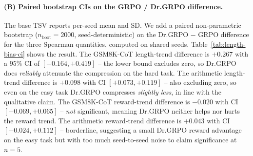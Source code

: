 \paragraph{(B) Paired bootstrap CIs on the GRPO / Dr.GRPO difference.}
The base TSV reports per-seed mean and SD. We add a paired
non-parametric bootstrap ($n_\text{boot}=2000$, seed-deterministic)
on the Dr.GRPO $-$ GRPO difference for the three Spearman
quantities, computed on shared seeds. Table~\ref{tab:length-bias-ci}
shows the result. The GSM8K-CoT length-trend difference is
$+0.267$ with a $95\%$ CI of $[+0.164, +0.419]$ -- the lower
bound excludes zero, so Dr.GRPO does \emph{reliably} attenuate
the compression on the hard task. The arithmetic length-trend
difference is $+0.098$ with CI $[+0.073, +0.119]$ -- also
excluding zero, so even on the easy task Dr.GRPO compresses
\emph{slightly less}, in line with the qualitative claim. The
GSM8K-CoT reward-trend difference is $-0.020$ with CI
$[-0.069, +0.065]$ -- \emph{not} significant, meaning Dr.GRPO
neither helps nor hurts the reward trend. The arithmetic
reward-trend difference is $+0.043$ with CI $[-0.024, +0.112]$ --
borderline, suggesting a small Dr.GRPO reward advantage on the
easy task but with too much seed-to-seed noise to claim
significance at $n{=}5$.

\begin{table}[htbp]
\centering
\small
{}
\caption{Paired bootstrap $95\%$ CIs on the Dr.GRPO $-$ GRPO
difference for the three Spearman quantities. Positive
$\Delta\rho(\text{step},\text{len})$ means Dr.GRPO compresses
\emph{less} (closer to zero or positive). On both tasks the
length-trend difference is significantly positive; the
reward-trend difference is not significantly different from zero
on either task. The within-run coupling
$\Delta\rho(\text{len},\text{reward})$ is positive on the easy
task (Dr.GRPO weakens the negative within-run coupling) and
negative on the hard task (Dr.GRPO strengthens it).}
\label{tab:length-bias-ci}
\end{table}

